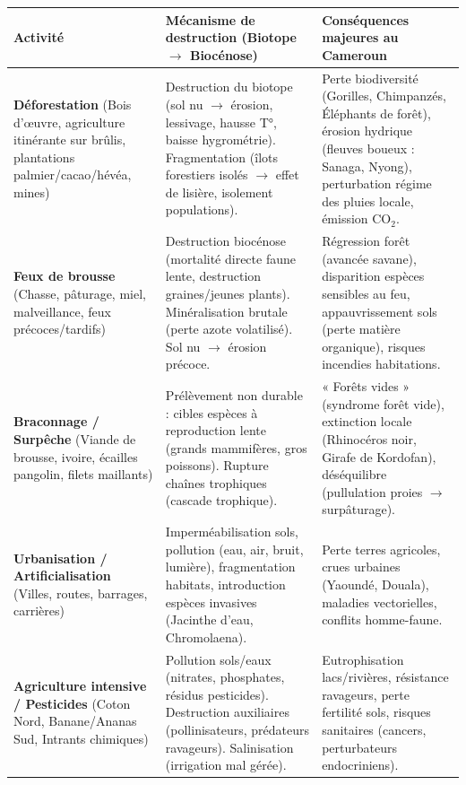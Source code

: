 \documentclass[11pt]{article}
\begin{document}
\begin{center}
\begin{tabularx}{\linewidth}{|l|X|X|}\hline
\rowcolor{popblueL}
\textbf{Activité} & \textbf{Mécanisme de destruction (Biotope $\to$ Biocénose)} & \textbf{Conséquences majeures au Cameroun} \\ \hline
\textbf{Déforestation} (Bois d'œuvre, agriculture itinérante sur brûlis, plantations palmier/cacao/hévéa, mines) & Destruction du biotope (sol nu $\to$ érosion, lessivage, hausse T°, baisse hygrométrie). Fragmentation (îlots forestiers isolés $\to$ effet de lisière, isolement populations). & Perte biodiversité (Gorilles, Chimpanzés, Éléphants de forêt), érosion hydrique (fleuves boueux : Sanaga, Nyong), perturbation régime des pluies locale, émission CO$_2$. \\ \hline
\textbf{Feux de brousse} (Chasse, pâturage, miel, malveillance, feux précoces/tardifs) & Destruction biocénose (mortalité directe faune lente, destruction graines/jeunes plants). Minéralisation brutale (perte azote volatilisé). Sol nu $\to$ érosion précoce. & Régression forêt (avancée savane), disparition espèces sensibles au feu, appauvrissement sols (perte matière organique), risques incendies habitations. \\ \hline
\textbf{Braconnage / Surpêche} (Viande de brousse, ivoire, écailles pangolin, filets maillants) & Prélèvement non durable : cibles espèces à reproduction lente (grands mammifères, gros poissons). Rupture chaînes trophiques (cascade trophique). & « Forêts vides » (syndrome forêt vide), extinction locale (Rhinocéros noir, Girafe de Kordofan), déséquilibre (pullulation proies $\to$ surpâturage). \\ \hline
\textbf{Urbanisation / Artificialisation} (Villes, routes, barrages, carrières) & Imperméabilisation sols, pollution (eau, air, bruit, lumière), fragmentation habitats, introduction espèces invasives (Jacinthe d'eau, Chromolaena). & Perte terres agricoles, crues urbaines (Yaoundé, Douala), maladies vectorielles, conflits homme-faune. \\ \hline
\textbf{Agriculture intensive / Pesticides} (Coton Nord, Banane/Ananas Sud, Intrants chimiques) & Pollution sols/eaux (nitrates, phosphates, résidus pesticides). Destruction auxiliaires (pollinisateurs, prédateurs ravageurs). Salinisation (irrigation mal gérée). & Eutrophisation lacs/rivières, résistance ravageurs, perte fertilité sols, risques sanitaires (cancers, perturbateurs endocriniens). \\ \hline
\end{tabularx}
\end{center}
\end{document}
